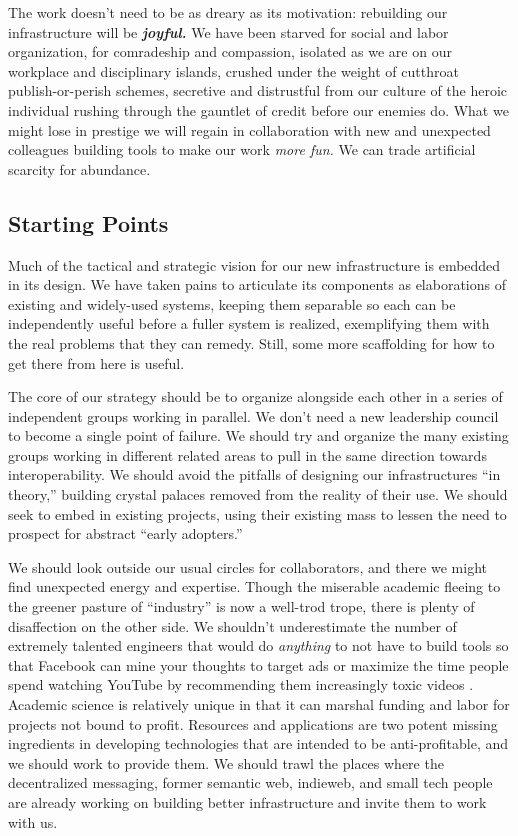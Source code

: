 The work doesn't need to be as dreary as its motivation: rebuilding our
infrastructure will be \textbf{\emph{joyful.}} We have been starved for
social and labor organization, for comradeship and compassion, isolated
as we are on our workplace and disciplinary islands, crushed under the
weight of cutthroat publish-or-perish schemes, secretive and distrustful
from our culture of the heroic individual rushing through the gauntlet
of credit before our enemies do. What we might lose in prestige we will
regain in collaboration with new and unexpected colleagues building
tools to make our work \emph{more fun.} We can trade artificial scarcity
for abundance.

\hypertarget{starting-points}{%
\subsection{Starting Points}\label{starting-points}}

Much of the tactical and strategic vision for our new infrastructure is
embedded in its design. We have taken pains to articulate its components
as elaborations of existing and widely-used systems, keeping them
separable so each can be independently useful before a fuller system is
realized, exemplifying them with the real problems that they can remedy.
Still, some more scaffolding for how to get there from here is useful.

The core of our strategy should be to organize alongside each other in a
series of independent groups working in parallel. We don't need a new
leadership council to become a single point of failure. We should try
and organize the many existing groups working in different related areas
to pull in the same direction towards interoperability. We should avoid
the pitfalls of designing our infrastructures ``in theory,'' building
crystal palaces removed from the reality of their use. We should seek to
embed in existing projects, using their existing mass to lessen the need
to prospect for abstract ``early adopters.''

We should look outside our usual circles for collaborators, and there we
might find unexpected energy and expertise. Though the miserable
academic fleeing to the greener pasture of ``industry'' is now a
well-trod trope, there is plenty of disaffection on the other side. We
shouldn't underestimate the number of extremely talented engineers that
would do \emph{anything} to not have to build tools so that Facebook can
mine your thoughts to target ads \citep{biddleFacebookWonSay2017} 
or maximize the time people spend watching YouTube by recommending them
increasingly toxic videos \citep{maackYouTubeRecommendationsAre2019} . Academic science is relatively unique in that it can marshal
funding and labor for projects not bound to profit. Resources and
applications are two potent missing ingredients in developing
technologies that are intended to be anti-profitable, and we should work
to provide them. We should trawl the places where the decentralized
messaging, former semantic web, indieweb, and small tech people are
already working on building better infrastructure and invite them to
work with us.

